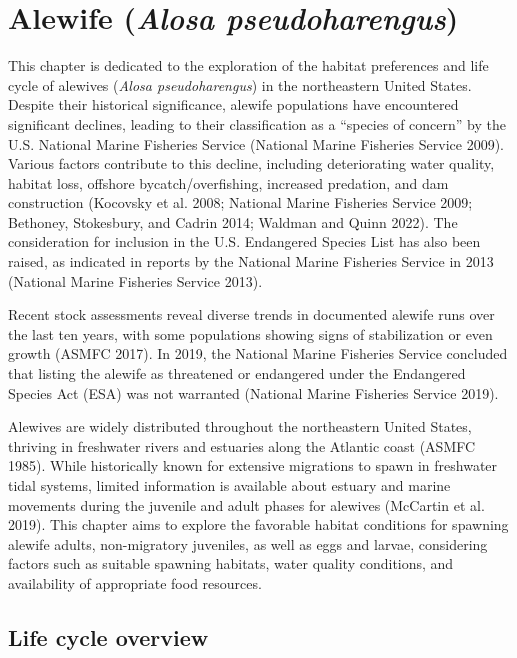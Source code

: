 \documentclass[
]{book}
\begin{document}
\hypertarget{alewife-alosa-pseudoharengus}{%
\chapter{\texorpdfstring{Alewife (\emph{Alosa pseudoharengus})}{Alewife (Alosa pseudoharengus)}}\label{alewife-alosa-pseudoharengus}}

This chapter is dedicated to the exploration of the habitat preferences and life cycle of alewives (\emph{Alosa pseudoharengus}) in the northeastern United States. Despite their historical significance, alewife populations have encountered significant declines, leading to their classification as a ``species of concern'' by the U.S. National Marine Fisheries Service (National Marine Fisheries Service 2009). Various factors contribute to this decline, including deteriorating water quality, habitat loss, offshore bycatch/overfishing, increased predation, and dam construction (Kocovsky et al. 2008; National Marine Fisheries Service 2009; Bethoney, Stokesbury, and Cadrin 2014; Waldman and Quinn 2022). The consideration for inclusion in the U.S. Endangered Species List has also been raised, as indicated in reports by the National Marine Fisheries Service in 2013 (National Marine Fisheries Service 2013).

Recent stock assessments reveal diverse trends in documented alewife runs over the last ten years, with some populations showing signs of stabilization or even growth (ASMFC 2017). In 2019, the National Marine Fisheries Service concluded that listing the alewife as threatened or endangered under the Endangered Species Act (ESA) was not warranted (National Marine Fisheries Service 2019).

Alewives are widely distributed throughout the northeastern United States, thriving in freshwater rivers and estuaries along the Atlantic coast (ASMFC 1985). While historically known for extensive migrations to spawn in freshwater tidal systems, limited information is available about estuary and marine movements during the juvenile and adult phases for alewives (McCartin et al. 2019). This chapter aims to explore the favorable habitat conditions for spawning alewife adults, non-migratory juveniles, as well as eggs and larvae, considering factors such as suitable spawning habitats, water quality conditions, and availability of appropriate food resources.

\hypertarget{life-cycle-overview}{%
\section{Life cycle overview}\label{life-cycle-overview}}
\end{document}
